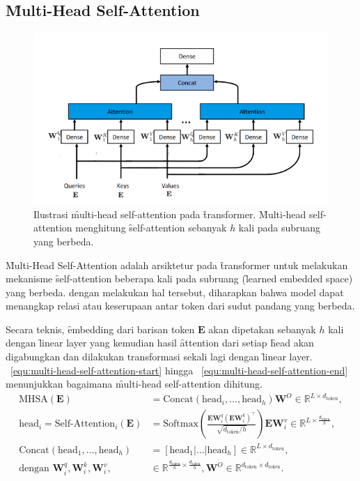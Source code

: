 	\subsection{\f{Multi-Head Self-Attention}}
	\begin{figure}
		\centering
		\includegraphics[width=1\textwidth]{assets/pics/MHSA.png}
		\caption{Ilustrasi \f{multi-head self-attention} pada \f{transformer}. \f{Multi-head self-attention} menghitung \f{self-attention} sebanyak $h$ kali pada subruang yang berbeda.}
		\label{fig:multi-head-self-attention}
	\end{figure}

	\f{Multi-Head Self-Attention} adalah arsiktetur pada \f{transformer} untuk melakukan mekanisme \f{self-attention} beberapa kali pada subruang (\f{learned embedded space}) yang berbeda. dengan melakukan hal tersebut, diharapkan bahwa model dapat menangkap relasi atau keserupaan antar token dari sudut pandang yang berbeda. 

	Secara teknis, \f{embedding} dari barisan token $\mathbf{E}$ akan dipetakan sebanyak $h$ kali dengan \f{linear layer} yang kemudian hasil \f{attention} dari setiap \f{head} akan digabungkan dan dilakukan transformasi sekali lagi dengan \f{linear layer}. \equ~\ref{equ:multi-head-self-attention-start} hingga \equ~\ref{equ:multi-head-self-attention-end} menunjukkan bagaimana \f{multi-head self-attention} dihitung.
	\begin{align}
		\label{equ:multi-head-self-attention-start}
		\text{MHSA}(\mathbf{E}) &= \text{Concat}(\text{head}_i, \dots, \text{head}_h)\mathbf{W}^O \in \mathbb{R}^{L \times d_{\text{token}}}, \\
		\text{head}_i = \text{Self-Attention}_i(\mathbf{E}) &= \text{Softmax}(\frac{\mathbf{E} \mathbf{W}^q_i (\mathbf{E} \mathbf{W}^k_i)^{\top}}{\sqrt{d_{\text{token}}/h}}) \mathbf{E} \mathbf{W}^v_i  \in  \mathbb{R}^{L \times \frac{d_{\text{token}}}{h}}, \\
		\text{Concat}(\text{head}_1, \dots, \text{head}_h) &= [\text{head}_1 | \dots | \text{head}_h] \in \mathbb{R}^{L \times d_{\text{token}}}, \\
		\label{equ:multi-head-self-attention-end}
		\text{dengan } \mathbf{W}^q_i, \mathbf{W}^k_i, \mathbf{W}^v_i,&\in \mathbb{R}^{\frac{d_{\text{token}}}{h} \times \frac{d_{\text{token}}}{h}}, \mathbf{W}^O \in \mathbb{R}^{d_{\text{token}} \times d_{\text{token}}}.
	\end{align}

